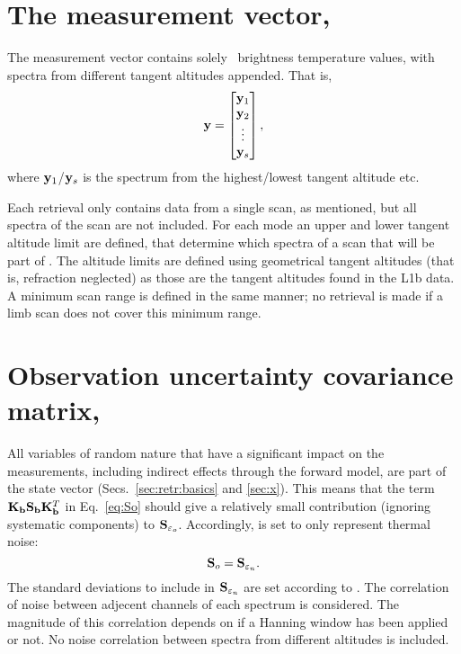 \section{The measurement vector, \MsrVct}
\label{sec:y}
%
The measurement vector contains solely \smr\ brightness temperature values,
with spectra from different tangent altitudes appended. That is,
\begin{equation}
  \label{eq:y}
  \mathbf{y} =
  \begin{bmatrix}
    \mathbf{y}_1\\ 
    \mathbf{y}_2\\ 
    \vdots\\ 
    \mathbf{y}_s
  \end{bmatrix},
\end{equation}
where $\mathbf{y}_1$/$\mathbf{y}_s$ is the spectrum from the highest/lowest tangent
altitude etc. 

Each retrieval only contains data from a single scan, as mentioned, but all
spectra of the scan are not included. For each mode an upper and lower tangent
altitude limit are defined, that determine which spectra of a scan that will be
part of \MsrVct. The altitude limits are defined using geometrical tangent
altitudes (that is, refraction neglected) as those are the tangent altitudes
found in the L1b data. A minimum scan range is defined in the same manner; no
retrieval is made if a limb scan does not cover this minimum range. 



\section{Observation uncertainty covariance matrix, }
\label{sec:So}
%
All variables of random nature that have a significant impact on the
measurements, including indirect effects through the forward model, are part of
the state vector (Secs.~\ref{sec:retr:basics} and \ref{sec:x}). This means that
the term $\mathbf{K}_{\mathbf{b}}\mathbf{S}_{\mathbf{b}} \mathbf{K}_{\mathbf{b}}^T$ in
Eq.~\ref{eq:So} should give a relatively small contribution (ignoring
systematic components) to $\mathbf{S}_{\varepsilon_o}$. Accordingly,  is
set to only represent thermal noise:
\begin{equation}
  \mathbf{S}_{o} = \mathbf{S}_{\varepsilon_n}.
\end{equation}
The standard deviations to include in $\mathbf{S}_{\varepsilon_n}$ are set
according to \citet{atbdl1b}. The correlation of noise between adjecent
channels of each spectrum is considered. The magnitude of this correlation
depends on if a Hanning window has been applied or not. No noise correlation
between spectra from different altitudes is included.



